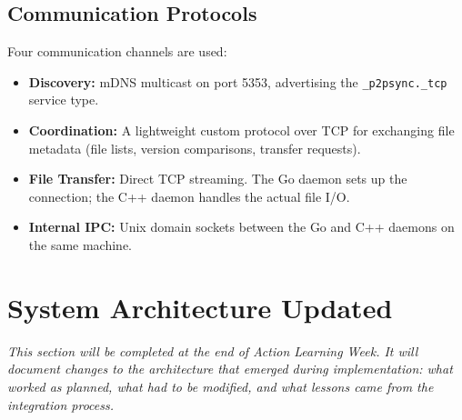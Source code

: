 \subsection{Communication Protocols}

Four communication channels are used:

\begin{itemize}
    \item \textbf{Discovery:} mDNS multicast on port 5353, advertising the \texttt{\_p2psync.\_tcp} service type.
    \item \textbf{Coordination:} A lightweight custom protocol over TCP for exchanging file metadata (file lists, version comparisons, transfer requests).
    \item \textbf{File Transfer:} Direct TCP streaming. The Go daemon sets up the connection; the C++ daemon handles the actual file I/O.
    \item \textbf{Internal IPC:} Unix domain sockets between the Go and C++ daemons on the same machine.
\end{itemize}

\section{System Architecture Updated}
\label{sec:arch-updated}

\textit{This section will be completed at the end of Action Learning Week. It will document changes to the architecture that emerged during implementation: what worked as planned, what had to be modified, and what lessons came from the integration process.}
